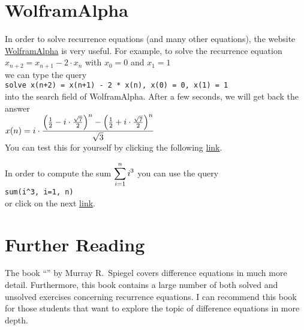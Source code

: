\section{WolframAlpha}
In order to solve recurrence equations (and many other equations), the website \href{https://www.wolframalpha.com/}{WolframAlpha}
 is very useful.  For example, to solve the recurrence equation
\\[0.2cm]
\hspace*{1.3cm}
$x_{n+2} = x_{n+1} - 2 \cdot x_n$ \quad with $x_0 = 0$ and $x_1 = 1$ 
\\[0.2cm]
we can type the query
\\[0.2cm]
\hspace*{1.3cm}
\texttt{solve x(n+2) = x(n+1) - 2 * x(n), x(0) = 0, x(1) = 1}
\\[0.2cm]
into the search field of WolframAlpha.  After a few seconds, we will get back the answer
\\[0.2cm]
\hspace*{1.3cm}
$\displaystyle x(n) = i \cdot \frac{\left(\frac{1}{2} - i \cdot\frac{\sqrt{7}}{2}\right)^n -
                          \left(\frac{1}{2} + i \cdot\frac{\sqrt{7}}{2}\right)^n}{\sqrt{3}}$
\\[0.2cm]
You can test this for yourself by clicking the following                        
\href{https://www.wolframalpha.com/input?i=solve+x%28n%2B2%29+%3D+x%28n%2B1%29+-+2+*+x%28n%29%2C+x%280%29+%3D+0%2C+x%281%29+%3D+1}{link}.

In order to compute the sum $\displaystyle\sum\limits_{i=1}^n i^3$ you can use the query
\\[0.2cm]
\hspace*{1.3cm}
\texttt{sum(i\^{ }3, i=1, n)}
\\[0.2cm]
or click on the next \href{https://www.wolframalpha.com/input?i=sum%28i%5E3%2C+i%3D1%2C+n%29}{link}.




\section{Further Reading}
The book ``'' by Murray R.~Spiegel
\cite{spiegel:1971} covers difference equations in much more detail.  Furthermore, this book contains a large
number of both solved and unsolved exercises concerning recurrence equations. 
I can recommend this book for those students that want to explore the topic of difference equations in more depth.


